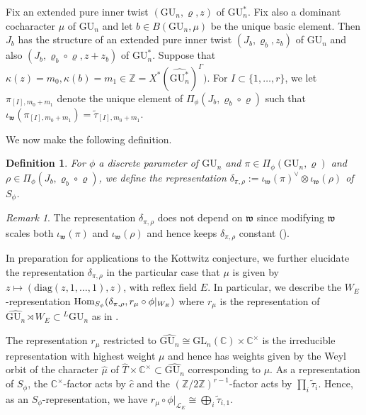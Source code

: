 \documentclass[reqno,11pt]{amsart}
\newtheorem{definition}[theorem]{Definition}
\theoremstyle{remark}
\newtheorem{remark}[theorem]{Remark}
\def\Hom{\mathop{\rm Hom}\nolimits}
\newcommand{\GU}{\mathrm{GU}}
\newcommand{\Z}{\mathbb{Z}}
\newcommand{\C}{\mathbb{C}}
\newcommand{\GL}{\mathrm{GL}}
\newcommand{\mc}{\mathcal}
\newcommand{\mf}{\mathfrak}
\newcommand{\diag}{\mathrm{diag}}
\newcommand{\LL}{{}^L}
\newcommand{\ttau}{\tilde{\tau}}
\begin{document}
Fix an extended pure inner twist $(\GU_n, \varrho, z)$ of $\GU^*_n$. Fix also a dominant cocharacter $\mu$ of $\GU_n$ and let $b \in B(\GU_n, \mu)$ be the unique basic element. Then $J_b$ has the structure of an extended pure inner twist $(J_b, \varrho_b, z_b)$ of $\GU_n$ and also $(J_b, \varrho_b \circ \varrho, z + z_b)$ of $\GU^*_n$. Suppose that $\kappa(z) = m_0, \kappa(b) = m_1 \in \Z=X^*(\widehat{\GU^*_n})^{\Gamma})$. For $I \subset \{1, \dots, r\}$, we let $\pi_{[I],m_0 + m_1}$ denote the unique element of $\Pi_{\phi}(J_b, \varrho_b \circ \varrho)$ such that $\iota_{\mf{w}}(\pi_{[I],m_0 + m_1}) = \ttau_{[I],m_0 + m_1}$.


We now make the following definition.
\begin{definition}
 For $\phi$ a discrete parameter of $\GU_{n}$ and $\pi \in \Pi_{\phi}(\GU_{n}, \varrho)$ and $\rho \in \Pi_{\phi}(J_{b}, \varrho_b \circ \varrho)$, we define the representation $\delta_{\pi,\rho} := \iota_{\mf{w}}(\pi)^{\vee} \otimes \iota_{\mf{w}}(\rho)$ of $S_{\phi}$. 
\end{definition}
\begin{remark}
The representation $\delta_{\pi, \rho}$ does not depend on $\mf{w}$ since modifying $\mf{w}$ scales both $\iota_{\mf{w}}(\pi)$ and $\iota_{\mf{w}}(\rho)$ and hence keeps $\delta_{\pi, \rho}$ constant (\cite{KalethaContragredients}).
\end{remark}

In preparation for applications to the Kottwitz conjecture, we further elucidate the representation $\delta_{\pi, \rho}$ in the particular case that $\mu$ is given by $z \mapsto (\diag(z,1, \dots, 1), z)$, with reflex field $E$. In particular, we describe the $W_{E}$-representation $\Hom_{S_{\phi}}(\delta_{\pi, \rho}, r_{\mu} \circ \phi|_{W_E})$ where $r_{\mu}$ is the representation of $\widehat{\GU_n} \rtimes W_E \subset \LL \GU_n$ as in \cite[Lemma (2.1.2)]{KottwitzTOO}. 

The representation $r_{\mu}$ restricted to $\widehat{\GU_n} \cong \GL_n(\C) \times \C^{\times}$ is the irreducible representation with highest weight $\mu$ and hence has weights given by the Weyl orbit of the character $\widehat{\mu}$ of $\widehat{T} \times \C^{\times} \subset \widehat{\GU_n}$ corresponding to $\mu$. As a representation of $S_{\phi}$, the $\C^{\times}$-factor acts by $\widehat{c}$ and the $(\Z/2\Z)^{r-1}$-factor acts by $\prod\limits_i \ttau_i$.  Hence, as an $S_{\phi}$-representation, we have $r_{\mu} \circ \phi|_{\mc{L}_E} \cong \bigoplus\limits_i \ttau_{i,1}$.
\end{document}
